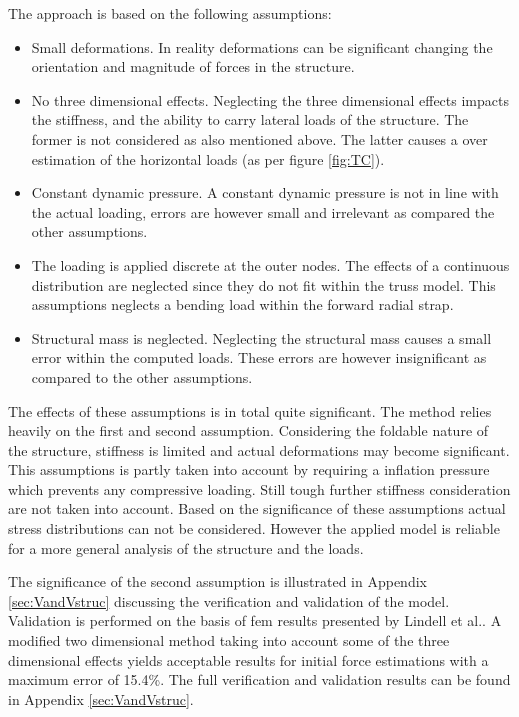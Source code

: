 The approach is based on the following assumptions:

\begin{itemize}
\item Small deformations. In reality deformations can be significant changing the orientation and magnitude of forces in the structure.
\item No three dimensional effects. Neglecting the three dimensional effects impacts the stiffness, and the ability to carry lateral loads of the structure. The former is not considered as also mentioned above. The latter causes a over estimation of the horizontal loads (as per figure \ref{fig:TC}).  
\item Constant dynamic pressure. A constant dynamic pressure is not in line with the actual loading, errors are however small and irrelevant as compared the other assumptions.
\item The loading is applied discrete at the outer nodes. The effects of a continuous distribution are neglected since they do not fit within the truss model. This assumptions neglects a bending load within the forward radial strap.
\item Structural mass is neglected. Neglecting the structural mass causes a small error within the computed loads. These errors are however insignificant as compared to the other assumptions.
\end{itemize} 

The effects of these assumptions is in total quite significant. The method relies heavily on the first and second assumption. Considering the foldable nature of the structure, stiffness is limited and actual deformations may become significant. This assumptions is partly taken into account by requiring a inflation pressure which prevents any compressive loading. Still tough further stiffness consideration are not taken into account. Based on the significance of these assumptions actual stress distributions can not be considered. However the applied model is reliable for a more general analysis of the structure and the loads.

The significance of the second assumption is illustrated in Appendix \ref{sec:VandVstruc} discussing the verification and validation of the model. Validation is performed on the basis of \gls{fem} results presented by Lindell et al.. A modified two dimensional method taking into account some of the three dimensional effects yields acceptable results for initial force estimations with a maximum error of 15.4\%. The full verification and validation results can be found in Appendix \ref{sec:VandVstruc}.


